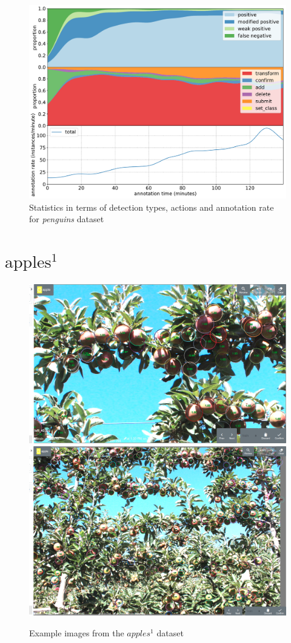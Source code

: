 \begin{figure}[!h]
\centering
\includegraphics[width=1.0\linewidth]{charts/action_annotations/penguins.pdf}
\caption{Statistics in terms of detection types, actions and annotation rate for \emph{penguins} dataset}
\label{fig:penguin_annotation}
\end{figure}



\pagebreak
\section{$\mathrm{apples^1}$}
\label{sec:apples1_details}

\begin{figure}[!h]
  \includegraphics[width=0.475\linewidth]{figures/annotation/screenshots/apples_big.png}
  \hfill
  \includegraphics[width=0.45\linewidth]{figures/annotation/screenshots/apples_small.png}
\caption{Example images from the $apples^1$ dataset}
\label{fig:apples1_dataset}  
\end{figure}

